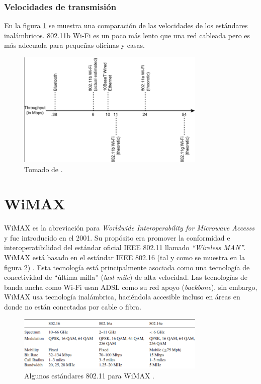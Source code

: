 \documentclass[10pt,journal,compsoc]{IEEEtran}
\begin{document}
\subsubsection{Velocidades de transmisión}
En la figura \ref{fig:wifi-velocidades} se muestra una comparación de las velocidades de los estándares inalámbricos. 802.11b Wi-Fi es un poco más lento que una red cableada pero es más adecuada para pequeñas oficinas y casas.

\begin{figure}[h]
    \centering
    \includegraphics[width=9cm]{wifi-velocidades}
    \caption{Tomado de \cite{davis}.}
    \label{fig:wifi-velocidades}
\end{figure}

\section{WiMAX}
WiMAX es la abreviación para \emph{Worldwide Interoperability for Microwave Accesss} y fue introducido en el 2001. Su propósito era promover la conformidad e interoperatibilidad del estándar oficial IEEE 802.11 llamado \emph{``Wireless MAN''}. WiMAX está basado en el estándar IEEE 802.16 (tal y como se muestra en la figura \ref{fig:wimax-standards}) . Esta tecnología está principalmente asociada como una tecnología de conectividad de ``última milla'' (\emph{last mile})  de alta velocidad. Las tecnologías de banda ancha como Wi-Fi usan ADSL como su red apoyo (\emph{backbone}), sin embargo, WiMAX usa tecnología inalámbrica, haciéndola accesible incluso en áreas en donde no están conectadas por cable o fibra.

\begin{figure}[h]
    \centering
    \includegraphics[width=9cm]{wimax-standards}
    \caption{Algunos estándares 802.11 para WiMAX \cite{davis}.}
    \label{fig:wimax-standards}
\end{figure}
\end{document}
